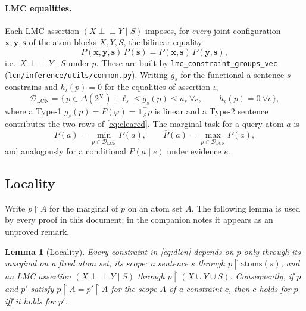 \documentclass[11pt]{article}
\newtheorem{lemma}{Lemma}
\theoremstyle{definition}
\newcommand{\lo}{\underline}
\newcommand{\hi}{\overline}
\newcommand{\indep}{\perp\!\!\!\perp}
\newcommand{\DLCN}{\mathcal{D}_{\mathrm{LCN}}}
\newcommand{\atoms}{\mathrm{atoms}}
\newcommand{\restr}{\!\restriction\!}
\begin{document}
\paragraph{LMC equalities.} Each LMC assertion $(X\indep Y\mid S)$ imposes, for \emph{every} joint
configuration $\mathbf x,\mathbf y,\mathbf s$ of the atom blocks $X,Y,S$, the bilinear equality
\begin{equation}\label{eq:lmc}
  P(\mathbf x,\mathbf y,\mathbf s)\,P(\mathbf s)=P(\mathbf x,\mathbf s)\,P(\mathbf y,\mathbf s),
\end{equation}
i.e.\ $X\indep Y\mid S$ under $p$. These are built by
\texttt{lmc\_constraint\_groups\_vec}
(\texttt{lcn/inference/utils/\allowbreak common.py}). Writing $g_s$ for the functional a sentence $s$ constrains
and $h_\iota(p)=0$ for the equalities of assertion $\iota$,
\begin{equation}\label{eq:dlcn}
  \DLCN=\bigl\{\,p\in\Delta(2^{\mathbf V})\;:\;
    \ell_s\le g_s(p)\le u_s\ \forall s,\qquad h_\iota(p)=0\ \forall \iota\,\bigr\},
\end{equation}
where a Type-1 $g_s(p)=P(\varphi)=\mathbf 1_\varphi^\top p$ is linear and a Type-2 sentence
contributes the two rows of \eqref{eq:cleared}. The marginal task for a query atom $a$ is
\[
  \lo P(a)=\min_{p\in\DLCN}P(a),\qquad \hi P(a)=\max_{p\in\DLCN}P(a),
\]
and analogously for a conditional $P(a\mid e)$ under evidence $e$.

\subsection{Locality}
Write $p\restr A$ for the marginal of $p$ on an atom set $A$. The following lemma is used by every
proof in this document; in the companion notes it appears as an unproved remark.

\begin{lemma}[Locality]\label{lem:locality}
Every constraint in \eqref{eq:dlcn} depends on $p$ only through its marginal on a fixed atom set,
its \emph{scope}: a sentence $s$ through $p\restr\atoms(s)$, and an LMC assertion $(X\indep Y\mid S)$
through $p\restr(X\cup Y\cup S)$. Consequently, if $p$ and $p'$ satisfy
$p\restr A=p'\restr A$ for the scope $A$ of a constraint $c$, then $c$ holds for $p$ iff it holds
for $p'$.
\end{lemma}
\end{document}
